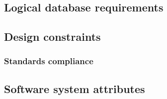 \documentclass{article}
\begin{document}





\subsection{Logical database requirements}


\subsection{Design constraints}

\subsubsection{Standards compliance}



\subsection{Software system attributes}
\end{document}
